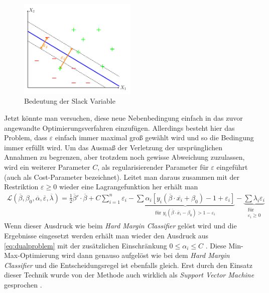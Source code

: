 \documentclass[
]{article}
\begin{document}
\begin{figure}[htb]
\centering
\includegraphics[width=0.5\textwidth,trim=0.5cm 0.5cm 0.5cm 0.5cm]{Images/slackvariable.pdf} 
        \caption{Bedeutung der Slack Variable}
        \label{fig:slackvariable}
\end{figure}

Jetzt könnte man versuchen, diese neue Nebenbedingung einfach in das
zuvor angewandte Optimierungsverfahren einzufügen. Allerdings besteht
hier das Problem, dass \(\varepsilon\) einfach immer maximal groß
gewählt wird und so die Bedingung immer erfüllt wird. Um das Ausmaß der
Verletzung der ursprünglichen Annahmen zu begrenzen, aber trotzdem noch
gewisse Abweichung zuzulassen, wird ein weiterer Parameter \(C\), als
regularisierender Parameter für \(\varepsilon\) eingeführt (auch als
Cost-Parameter bezeichnet). Leitet man daraus zusammen mit der
Restriktion \(\varepsilon\ge0\) wieder eine Lagrangefunktion her erhält
man \begin{align}
\mathcal{L}(\overline\beta,\beta_0,\overline\alpha,\overline\varepsilon,\overline\lambda)=\frac{1}{2}\overline\beta'\cdot \overline\beta + C \sum_{i=1}^{n}\varepsilon_i-\underbrace{\sum \alpha_i[y_i(\overline\beta \cdot \overline{x_i}+\beta_0)-1+\varepsilon_i]}_{\text{für }y_i(\overline\beta \cdot \overline{x}_i-\beta_0)>1- \varepsilon_i}-\underbrace{\sum \lambda_i \varepsilon_i }_{\substack{\text{für}\\ \varepsilon_i \ge 0}}
\end{align} Wenn dieser Ausdruck wie beim
\textit{Hard Margin Classifier} gelöst wird und die Ergebnisse
eingesetzt werden erhält man wieder den Ausdruck aus
\eqref{eq:dualproblem} mit der zusätzlichen Einschränkung
\(0\le \alpha_i \le C\) \parencite{bennettSupportVectorMachines2000}.
Diese Min-Max-Optimierung wird dann genauso aufgelöst wie bei dem
\textit{Hard Margin Classifier} und die Entscheidungsregel ist ebenfalls
gleich. Erst durch den Einsatz dieser Technik wurde von der Methode auch
wirklich als \textit{Support Vector Machine} gesprochen
\parencite{vapnikEstimationDependencesBased2006}.
\end{document}
